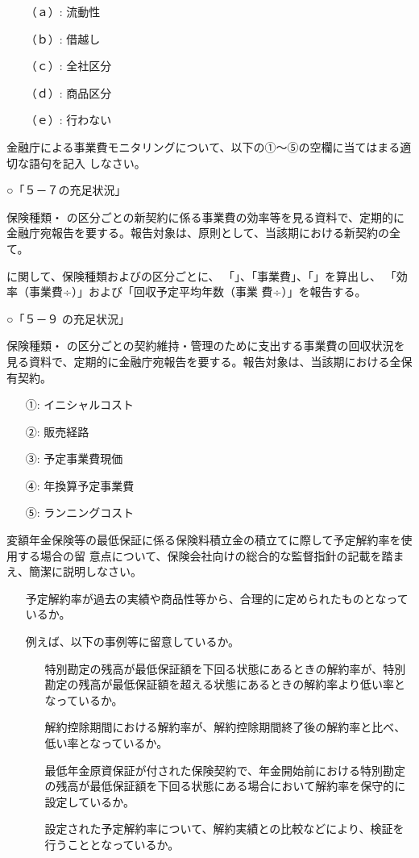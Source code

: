 \documentclass[report,gutter=10mm,fore-edge=10mm,uplatex,dvipdfmx]{jlreq}
\begin{document}
\answer{}
\begin{itemize}
\item[ （ａ）: ]  流動性
\item[ （ｂ）: ]  借越し
\item[ （ｃ）: ]  全社区分
\item[ （ｄ）: ]  商品区分
\item[ （ｅ）: ]  行わない
\end{itemize}

金融庁による事業費モニタリングについて、以下の①～⑤の空欄に当てはまる適切な語句を記入
しなさい。

\noindent ○「５－７の充足状況」

保険種類・
の区分ごとの新契約に係る事業費の効率等を見る資料で、定期的に
金融庁宛報告を要する。報告対象は、原則として、当該期における新契約の全て。

に関して、保険種類およびの区分ごとに、
「」、「事業費」、「」を算出し、
「効率（事業費÷）」および「回収予定平均年数（事業
費÷）」を報告する。

\noindent ○「５－９ の充足状況」

保険種類・
の区分ごとの契約維持・管理のために支出する事業費の回収状況を
見る資料で、定期的に金融庁宛報告を要する。報告対象は、当該期における全保有契約。
\answer{}
\begin{itemize}
\item[ ①: ] イニシャルコスト
\item[ ②: ] 販売経路
\item[ ③: ] 予定事業費現価
\item[ ④: ] 年換算予定事業費
\item[ ⑤: ] ランニングコスト
\end{itemize}

変額年金保険等の最低保証に係る保険料積立金の積立てに際して予定解約率を使用する場合の留
意点について、保険会社向けの総合的な監督指針の記載を踏まえ、簡潔に説明しなさい。

\answer{}
\begin{itemize}
\item[]  予定解約率が過去の実績や商品性等から、合理的に定められたものとなっているか。
\item[]  例えば、以下の事例等に留意しているか。
\begin{itemize}
\item[]  特別勘定の残高が最低保証額を下回る状態にあるときの解約率が、特別勘定の残高が最低保証額を超える状態にあるときの解約率より低い率となっているか。
\item[]  解約控除期間における解約率が、解約控除期間終了後の解約率と比べ、低い率となっているか。
\item[]  最低年金原資保証が付された保険契約で、年金開始前における特別勘定の残高が最低保証額を下回る状態にある場合において解約率を保守的に設定しているか。
\item[]  設定された予定解約率について、解約実績との比較などにより、検証を行うこととなっているか。
\end{itemize}
\end{itemize}
\end{document}
